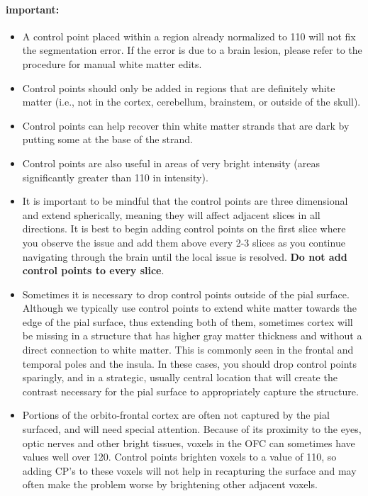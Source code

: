 \documentclass[paper=a4, fontsize=11pt]{scrartcl} %
\numberwithin{equation}{section} %
\numberwithin{figure}{section} %
\numberwithin{table}{section} %
\begin{document}
\paragraph{important:} 
\begin{itemize}
\item A control point placed within a region already normalized to 110 will not fix the segmentation error.  If the error is due to a brain lesion, please refer to the procedure for manual white matter edits.

\item Control points should only be added in regions that are definitely white matter (i.e., not in the cortex, cerebellum, brainstem, or outside of the skull).

\item Control points can help recover thin white matter strands that are dark by putting some at the base of the strand.

\item Control points are also useful in areas of very bright intensity (areas significantly greater than 110 in intensity).

\item It is important to be mindful that the control points are three dimensional and extend spherically, meaning they will affect adjacent slices in all directions.  It is best to begin adding control points on the first slice where you observe the issue and add them above every 2-3 slices as you continue navigating through the brain until the local issue is resolved.  \textbf{Do not add control points to every slice}.

\item Sometimes it is necessary to drop control points outside of the pial surface.  Although we typically use control points to extend white matter towards the edge of the pial surface, thus extending both of them, sometimes cortex will be missing in a structure that has higher gray matter thickness and without a direct connection to white matter. This is commonly seen in the frontal and temporal poles and the insula.  In these cases, you should drop control points sparingly, and in a strategic, usually central location that will create the contrast necessary for the pial surface to appropriately capture the structure.

\item Portions of the orbito-frontal cortex are often not captured by the pial surfaced, and will need special attention.  Because of its proximity to the eyes, optic nerves and other bright tissues, voxels in the OFC can sometimes have values well over 120.  Control points brighten voxels to a value of 110, so adding CP's to these voxels will not help in recapturing the surface and may often make the problem worse by brightening other adjacent voxels.
\end{itemize}
\end{document}
